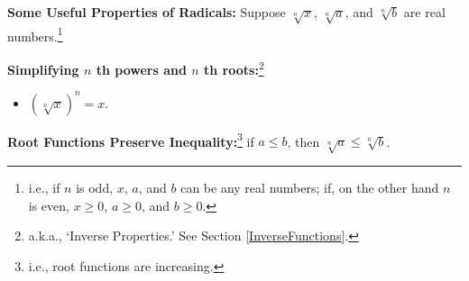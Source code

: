 \documentclass{ximera}
\begin{document}
\begin{theorem} \label{basicradicalpropseqineq}  \textbf{Some Useful Properties of Radicals:}  Suppose $\sqrt[n]{x}$, $\sqrt[n]{a}$, and $\sqrt[n]{b}$ are real numbers.\footnote{i.e., if $n$ is odd, $x$, $a$, and $b$ can be any real numbers;  if, on the other hand $n$ is even, $x \geq 0$, $a \geq 0$, and $b \geq 0$.}


\textbf{Simplifying $n$ th powers and $n$ th roots:}\footnote{a.k.a., `Inverse Properties.'  See Section \ref{InverseFunctions}.}

\begin{itemize}

\item  $\left( \sqrt[n]{x}\right)^n = x$.


\end{itemize}

\textbf{Root Functions Preserve Inequality:}\footnote{i.e., root functions are increasing.}  if $a \leq b$, then $\sqrt[n]{a} \leq \sqrt[n]{b}$.

\end{theorem}
\end{document}
